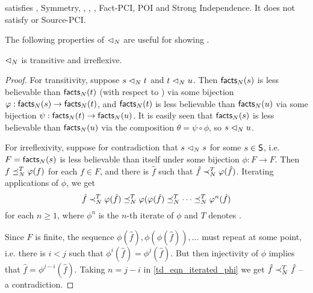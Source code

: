 \begin{theorem}
\label{td_thm_scvoting_axioms}
    \scvoting{} satisfies \sourcecoherence{}, Symmetry, \unanimity{},
    \groundedness{},
    \monotonicity{}, Fact-PCI, POI and Strong Independence. It does not
    satisfy \factcoherence{} or Source-PCI.
\end{theorem}

The following properties of ${\scoh_N}$ are useful for showing
\sourcecoherence{}.

\begin{lemma}
    $\scoh_N$ is transitive and irreflexive.
\end{lemma}

\begin{proof}

For transitivity, suppose $s \scoh_N t$ and $t \scoh_N u$. Then $\facts_N(s)$
is less believable than $\facts_N(t)$ (with respect to \voting{}) via some
bijection $\phi: \facts_N(s) \to \facts_N(t)$, and $\facts_N(t)$ is less
believable than $\facts_N(u)$ via some bijection $\psi: \facts_N(t) \to
\facts_N(u)$. It is easily seen that $\facts_N(s)$ is less believable than
$\facts_N(u)$ via the composition $\theta = \psi \circ \phi$, so $s \scoh_N u$.

For irreflexivity, suppose for contradiction that $s \scoh_N s$ for some $s \in
\S$, i.e. $F = \facts_N(s)$ is less believable than itself under some bijection
$\phi: F \to F$. Then ${f \fle_N^T \phi(f)}$ for each $f \in F$, and there is
$\hat{f}$ such that ${\hat{f} \flt_N^T \phi(\hat{f})}$. Iterating applications
of $\phi$, we get
\begin{equation}
    \label{td_eqn_iterated_phi}
    \hat{f} \flt_N^T \phi(\hat{f}) \fle_N^T \phi(\phi(\hat{f}) \fle_N^T \cdots
    \fle_N^T \phi^n(\hat{f})
\end{equation}
for each $n \ge 1$, where $\phi^n$ is the $n$-th iterate of $\phi$ and $T$
denotes \voting{}.

Since $F$ is finite, the sequence $\phi(\hat{f}), \phi(\phi(\hat{f})), \ldots$
must repeat at some point, i.e. there is $i < j$ such that
$\phi^i(\hat{f}) = \phi^j(\hat{f})$. But then injectivity of $\phi$ implies
that $\hat{f} = \phi^{j - i}(\hat{f})$. Taking $n = j - i$ in
\cref{td_eqn_iterated_phi} we get $\hat{f} \flt_N^T \hat{f}$ -- a contradiction.
\end{proof}

